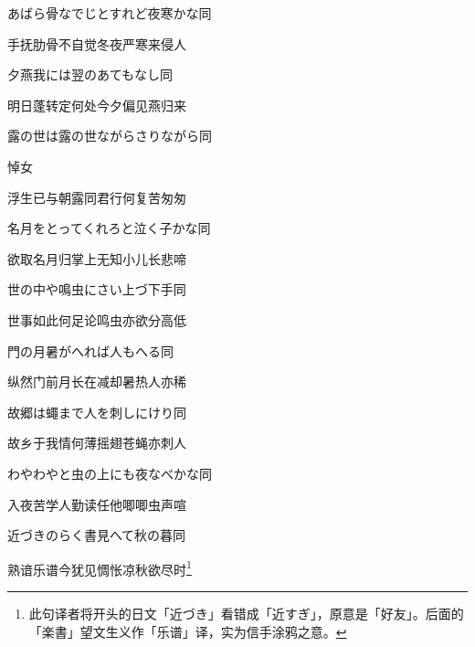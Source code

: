 \begin{haiku}
    {\FH あばら骨なでじとすれど夜寒かな}\hfill{\FH 同}

    {\FK 手抚肋骨不自觉冬夜严寒来侵人}
\end{haiku}

\begin{haiku}
    {\FH 夕燕我には翌のあてもなし}\hfill{\FH 同}

    {\FK 明日蓬转定何处今夕偏见燕归来}
\end{haiku}

\begin{haiku}
    {\FH 露の世は露の世ながらさりながら}\hfill{\FH 同}

    {\FK 悼女}

    {\FK 浮生已与朝露同君行何复苦匆匆}
\end{haiku}

\begin{haiku}
    {\FH 名月をとってくれろと泣く子かな}\hfill{\FH 同}

    {\FK 欲取名月归掌上无知小儿长悲啼}
\end{haiku}

\begin{haiku}
    {\FH 世の中や鳴虫にさい上づ下手}\hfill{\FH 同}

    {\FK 世事如此何足论鸣虫亦欲分高低}
\end{haiku}

\begin{haiku}
    {\FH 門の月暑がへれば人もへる}\hfill{\FH 同}

    {\FK 纵然门前月长在减却暑热人亦稀}
\end{haiku}

\begin{haiku}
    {\FH 故郷は蠅まで人を刺しにけり}\hfill{\FH 同}

    {\FK 故乡于我情何薄摇翅苍蝇亦刺人}
\end{haiku}

\begin{haiku}
    {\FH わやわやと虫の上にも夜なべかな}\hfill{\FH 同}

    {\FK 入夜苦学人勤读任他唧唧虫声喧}
\end{haiku}

\begin{haiku}
    {\FH 近づきのらく書見へて秋の暮}\hfill{\FH 同}

    {\FK 熟谙乐谱今犹见惆怅凉秋欲尽时\footnote{\FT 此句译者将开头的日文「近づき」看错成「近すぎ」，原意是「好友」。后面的「楽書」望文生义作「乐谱」译，实为信手涂鸦之意。}}
\end{haiku}

